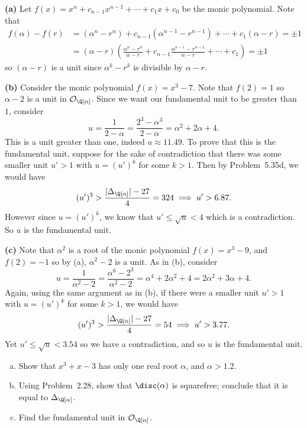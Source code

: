 \documentclass[11pt,letterpaper]{article}
\begin{document}
\begin{solution}
    \textbf{(a)} Let $f(x)=x^n+c_{n-1}x^{n-1}+\cdots+c_1x + c_0$ be the monic polynomial. Note that 
    \[
        \begin{aligned}
            f(\alpha)-f(r)&=(\alpha^n-r^n)+c_{n-1}(\alpha^{n-1}-r^{n-1})+\cdots+c_1(\alpha-r)=\pm 1\\
            &=(\alpha-r)\left(\frac{\alpha^n-r^n}{\alpha-r}+c_{n-1}\frac{\alpha^{n-1}-r^{n-1}}{\alpha-r}+\cdots+c_1\right)=\pm 1
        \end{aligned}
    \]
    so $(\alpha-r)$ is a unit since $\alpha^k-r^k$ is divisible by $\alpha-r$.   
    
    \textbf{(b)} Consider the monic polynomial $f(x)=x^3-7$. Note that $f(2)=1$ so $\alpha-2$ is a unit in $\mathcal{O}_{\Q[\alpha]}$. Since we want our fundamental unit to be greater than $1$, consider 
    \[
        u=\frac{1}{2-\alpha}=\frac{2^3-\alpha^3}{2-\alpha}=\boxed{\alpha^2+2\alpha+4}
    .\] 
    This is a unit greater than one, indeed $u\approx 11.49$. To prove that this is the fundamental unit, suppose for the sake of contradiction that there was some smaller unit $u'>1$ with $u=(u')^k$ for some $k>1$. Then by Problem~5.35d, we would have
    \[
        (u')^3 > \frac{|\Delta_{\Q[\alpha]}| - 27}{4} = 324\implies u'> 6.87
    .\]   
    However since $u=(u')^k$, we know that $u' \leq \sqrt{u} < 4$ which is a contradiction. So $u$ is the fundamental unit.  

    \textbf{(c)} Note that $\alpha^2$ is a root of the monic polynomial $f(x)=x^3-9$, and $f(2)=-1$ so by (a), $\alpha^2-2$ is a unit. As in (b), consider
    \[
        u=\frac{1}{\alpha^2-2}=\frac{\alpha^6-2^3}{\alpha^2-2} = \alpha^4 + 2\alpha^2+4 = \boxed{2\alpha^2+3\alpha+4}
    .\]   
    Again, using the same argument as in (b), if there were a smaller unit $u'>1$ with $u=(u')^k$ for some $k>1$, we would have
    \[
        (u')^3 > \frac{|\Delta_{\Q[\alpha]}| - 27}{4} = 54 \implies u' > 3.77
    .\]  
    Yet $u' \leq \sqrt{u} < 3.54$ so we have a contradiction, and so $u$ is the fundamental unit.
\end{solution}

\begin{cproblem}{5.38}\noindent
    \begin{enumerate}[(a)]
        \item Show that $x^3+x-3$ has only one real root $\alpha$, and $\alpha > 1.2$.
        \item Using Problem~2.28, show that $\disc(\alpha)$ is squarefree; conclude that it is equal to $\Delta_{\Q[\alpha]}$.
        \item Find the fundamental unit in $\mathcal{O}_{\Q[\alpha]}$.
    \end{enumerate}    
\end{cproblem}
\end{document}

